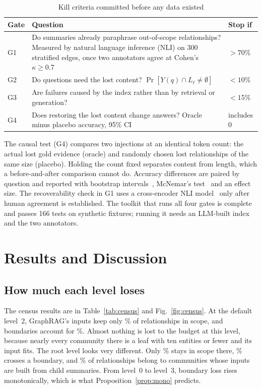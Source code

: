 \documentclass{ieeeaccess}
\theoremstyle{remark}
\begin{document}
\begin{table}[!htbp]
\caption{Kill criteria committed before any data existed}\label{tab:gates}
\centering\footnotesize
\begin{tabular}{@{}lp{4.3cm}l@{}}
\toprule
Gate & Question & Stop if \\
\midrule
G1 & Do summaries already paraphrase out-of-scope relationships? Measured by natural language inference (NLI) on 300 stratified edges, once two annotators agree at Cohen's $\kappa\ge0.7$~\cite{cohen1960kappa} & $>70\%$ \\
G2 & Do questions need the lost content? $\Pr[Y(q)\cap L_\ell\ne\emptyset]$ & $<10\%$ \\
G3 & Are failures caused by the index rather than by retrieval or generation? & $<15\%$ \\
G4 & Does restoring the lost content change answers? Oracle minus placebo accuracy, 95\% CI & includes 0 \\
\bottomrule
\end{tabular}
\end{table}

The causal test (G4) compares two injections at an identical token count: the actual lost gold evidence (oracle) and randomly chosen lost relationships of the same size (placebo). Holding the count fixed separates content from length, which a before-and-after comparison cannot do. Accuracy differences are paired by question and reported with bootstrap intervals~\cite{efron1979bootstrap}, McNemar's test~\cite{mcnemar1947} and an effect size. The recoverability check in G1 uses a cross-encoder NLI model~\cite{he2021deberta} only after human agreement is established. The toolkit that runs all four gates is complete and passes 166 tests on synthetic fixtures; running it needs an LLM-built index and the two annotators.

\section{Results and Discussion}\label{sec:results}

\subsection{How much each level loses}\label{sec:census}
The census results are in Table~\ref{tab:census} and Fig.~\ref{fig:census}. At the default level~2, GraphRAG's inputs keep only \CovCG\% of relationships in scope, and boundaries account for \BndCG\%. Almost nothing is lost to the budget at this level, because nearly every community there is a leaf with ten entities or fewer and its input fits. The root level looks very different. Only \CovAG\% stays in scope there, \BndAG\% crosses a boundary, and \IndAG\% of relationships belong to communities whose inputs are built from child summaries. From level~0 to level~3, boundary loss rises monotonically, which is what Proposition~\ref{prop:mono} predicts.
\end{document}
